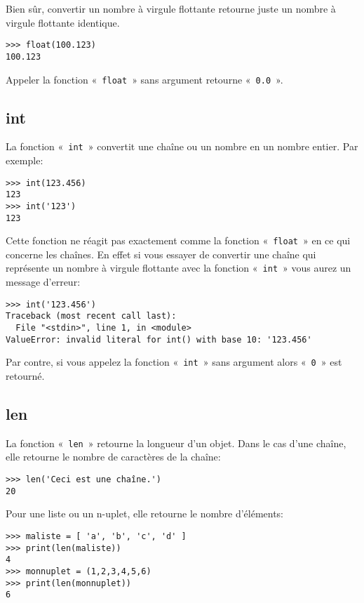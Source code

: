 Bien sûr, convertir un nombre à virgule flottante retourne juste un nombre à virgule flottante identique.
\begin{Verbatim}[frame=single,rulecolor=\color{gray}]
>>> float(100.123)
100.123
\end{Verbatim}

Appeler la fonction «~\texttt{float}~» sans argument retourne «~\texttt{0.0}~». 

\subsection*{int}

La fonction «~\texttt{int}~» convertit une chaîne ou un nombre en un nombre entier. Par exemple:

\begin{Verbatim}[frame=single,rulecolor=\color{gray}]
>>> int(123.456)
123
>>> int('123')
123
\end{Verbatim}

Cette fonction ne réagit pas exactement comme la fonction «~\texttt{float}~» en ce qui concerne les chaînes. En effet si vous essayer de convertir une chaîne qui représente un nombre à virgule flottante avec la fonction «~\texttt{int}~» vous aurez un message d'erreur:
\begin{Verbatim}[frame=single,rulecolor=\color{gray}]
>>> int('123.456')
Traceback (most recent call last):
  File "<stdin>", line 1, in <module>
ValueError: invalid literal for int() with base 10: '123.456'
\end{Verbatim}

Par contre, si vous appelez la fonction «~\texttt{int}~»  sans argument alors «~\texttt{0}~» est retourné.

\subsection*{len}

La fonction «~\texttt{len}~» retourne la longueur d'un objet. Dans le cas d'une chaîne, elle retourne le nombre de caractères de la chaîne:
\begin{Verbatim}[frame=single,rulecolor=\color{gray}]
>>> len('Ceci est une chaîne.')
20
\end{Verbatim}

Pour une liste ou un n-uplet, elle retourne le nombre d'éléments:
\begin{Verbatim}[frame=single,rulecolor=\color{gray}]
>>> maliste = [ 'a', 'b', 'c', 'd' ]
>>> print(len(maliste))
4
>>> monnuplet = (1,2,3,4,5,6)
>>> print(len(monnuplet))
6
\end{Verbatim}


